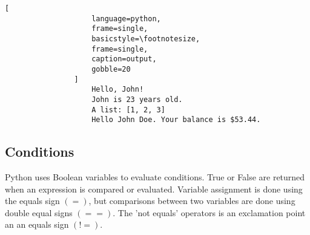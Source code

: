 \documentclass[crop=false,class=book]{standalone}
\begin{document}
            \begin{minipage}[t]{.48\textwidth}
                \centering
                \begin{lstlisting}[
                    language=python,
                    frame=single,
                    basicstyle=\footnotesize,
                    frame=single,
                    caption=output,
                    gobble=20
                ]
                    Hello, John!
                    John is 23 years old.
                    A list: [1, 2, 3]
                    Hello John Doe. Your balance is $53.44.

                \end{lstlisting}
            \end{minipage}
        \subsection{Conditions}
            Python uses Boolean variables to evaluate conditions.
            True or False are returned when an expression is
            compared or evaluated. Variable assignment is done
            using the equals sign $(=)$, but comparisons between
            two variables are done using double equal signs
            $(==)$. The 'not equals' operators is an exclamation
            point an an equals sign $(!=)$.
\end{document}
